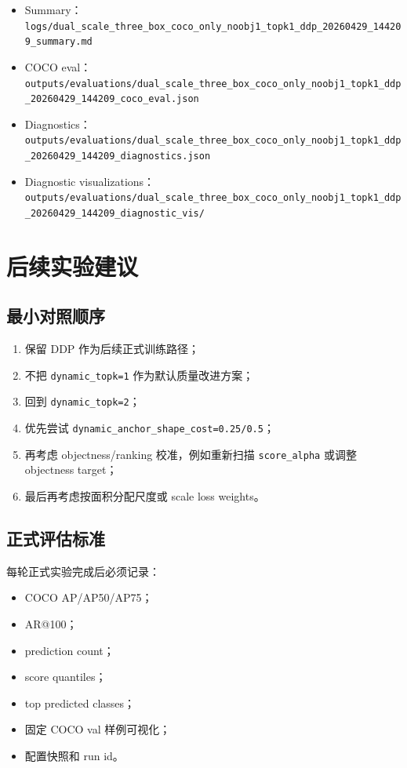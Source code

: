 \documentclass[UTF8]{ctexart}
\begin{document}
\begin{itemize}[leftmargin=2em]
  \item Summary：\texttt{logs/dual\_scale\_three\_box\_coco\_only\_noobj1\_topk1\_ddp\_20260429\_144209\_summary.md}
  \item COCO eval：\texttt{outputs/evaluations/dual\_scale\_three\_box\_coco\_only\_noobj1\_topk1\_ddp\_20260429\_144209\_coco\_eval.json}
  \item Diagnostics：\texttt{outputs/evaluations/dual\_scale\_three\_box\_coco\_only\_noobj1\_topk1\_ddp\_20260429\_144209\_diagnostics.json}
  \item Diagnostic visualizations：\texttt{outputs/evaluations/dual\_scale\_three\_box\_coco\_only\_noobj1\_topk1\_ddp\_20260429\_144209\_diagnostic\_vis/}
\end{itemize}

\section{后续实验建议}

\subsection{最小对照顺序}

\begin{enumerate}[leftmargin=2em]
  \item 保留 DDP 作为后续正式训练路径；
  \item 不把 \texttt{dynamic\_topk=1} 作为默认质量改进方案；
  \item 回到 \texttt{dynamic\_topk=2}；
  \item 优先尝试 \texttt{dynamic\_anchor\_shape\_cost=0.25/0.5}；
  \item 再考虑 objectness/ranking 校准，例如重新扫描 \texttt{score\_alpha} 或调整 objectness target；
  \item 最后再考虑按面积分配尺度或 scale loss weights。
\end{enumerate}

\subsection{正式评估标准}

每轮正式实验完成后必须记录：

\begin{itemize}[leftmargin=2em]
  \item COCO AP/AP50/AP75；
  \item AR@100；
  \item prediction count；
  \item score quantiles；
  \item top predicted classes；
  \item 固定 COCO val 样例可视化；
  \item 配置快照和 run id。
\end{itemize}
\end{document}
